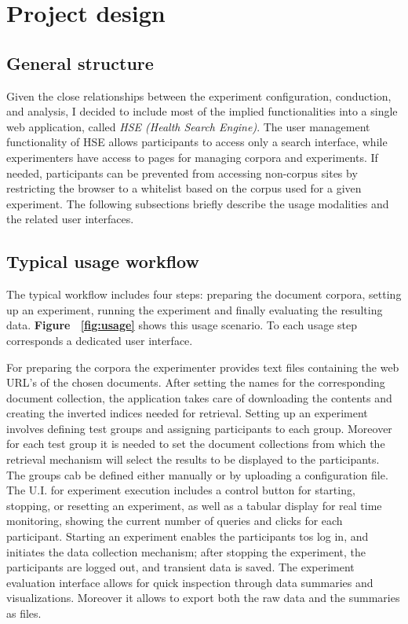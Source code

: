 \documentclass[]{usiinfbachelorproject}
\begin{document}
\section{Project design} \label{design}

\subsection{General structure}

Given the close relationships between the experiment configuration, conduction, and analysis, I decided to include
most of the implied functionalities into a single web application, called \emph{HSE (Health Search Engine)}.
The user management functionality of HSE allows participants to access only a search interface, while experimenters
have access to pages for managing corpora and experiments. If needed, participants can be prevented from
accessing non-corpus sites by restricting the browser to a whitelist based on the corpus used for a given experiment.
The following subsections briefly describe the usage modalities and the related user interfaces.

\subsection{Typical usage workflow}

The typical workflow includes four steps: preparing the document corpora, setting up an experiment, running the experiment
and finally evaluating the resulting data. \textbf{Figure ~\ref{fig:usage}} shows this usage scenario. 
To each usage step corresponds a dedicated user interface. 

For preparing the corpora the experimenter provides text files containing the web URL's of the chosen documents. After setting the names for the
corresponding document collection, the application takes care of downloading the contents and creating the inverted indices needed for retrieval.
Setting up an experiment involves defining test groups and assigning participants to each group. Moreover for each test group it is needed
to set the document collections from which the retrieval mechanism will select the results to be displayed to the participants.
The groups cab be defined either manually or by uploading a configuration file.
The U.I. for experiment execution includes a control button for starting, stopping, or resetting an experiment, as well 
as a tabular display for real time monitoring, showing the current number of queries and clicks for each participant.
Starting an experiment enables the participants tos log in, and initiates the data collection mechanism; after
stopping the experiment, the participants are logged out, and transient data is saved.
The experiment evaluation interface  allows for quick inspection through data summaries and visualizations. Moreover it allows
to export both the raw data and the summaries as files.
\end{document}
